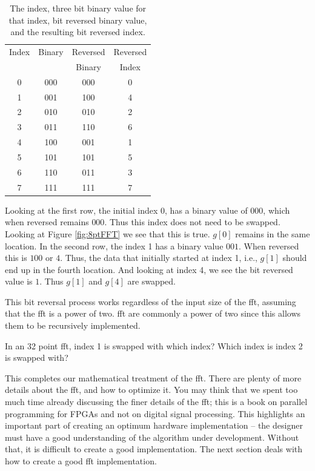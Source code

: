 \begin{table}[htbp]
\caption{The index, three bit binary value for that index, bit reversed binary value, and the resulting bit reversed index.}
\begin{center}
\begin{tabular}{|c|c|c|c|}
\hline
Index & Binary & Reversed & Reversed \\
 & & Binary & Index \\
\hline
0 & 000 & 000 & 0 \\
1 & 001 & 100 & 4 \\
2 & 010 & 010 & 2 \\
3 & 011 & 110 & 6 \\
4 & 100 & 001 & 1 \\
5 & 101 & 101 & 5 \\
6 & 110 & 011 & 3 \\
7 & 111 & 111 & 7 \\
\hline
\end{tabular}
\end{center}
\label{table:bit_reverse}
\end{table}

Looking at the first row, the initial index $0$, has a binary value of $000$, which when reversed remains $000$. Thus this index does not need to be swapped. Looking at Figure \ref{fig:8ptFFT} we see that this is true. $g[0]$ remains in the same location. In the second row, the index 1 has a binary value $001$. When reversed this is $100$ or $4$. Thus, the data that initially started at index 1, i.e., $g[1]$ should end up in the fourth location. And looking at index 4, we see the bit reversed value is $1$. Thus $g[1]$ and $g[4]$ are swapped.  

This bit reversal process works regardless of the input size of the \gls{fft}, assuming that the \gls{fft} is a power of two. \gls{fft} are commonly a power of two since this allows them to be recursively implemented.

\begin{exercise}
In an 32 point \gls{fft}, index 1 is swapped with which index? Which index is index 2 is swapped with?
\end{exercise}

This completes our mathematical treatment of the \gls{fft}. There are plenty of more details about the \gls{fft}, and how to optimize it. You may think that we spent too much time already discussing the finer details of the \gls{fft}; this is a book on parallel programming for FPGAs and not on digital signal processing. This highlights an important part of creating an optimum hardware implementation -- the designer must have a good understanding of the algorithm under development. Without that, it is difficult to create a good implementation. The next section deals with how to create a good \gls{fft} implementation. 

